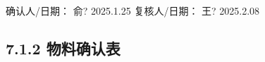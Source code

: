 \documentclass[UTF8,10pt,a4paper,fontset=fandol]{ctexart}
\newcommand{\fieldvalue}[1]{#1}
\newcommand{\handwritten}[1]{#1}
\begin{document}
\vspace{2mm}

确认人/日期：
\fieldvalue{\handwritten{俞?}}
\quad
\fieldvalue{\handwritten{2025.1.25}}
\hfill
复核人/日期：
\fieldvalue{\handwritten{王?}}
\quad
\fieldvalue{\handwritten{2025.2.08}}

\subsection*{7.1.2 物料确认表}
\end{document}
